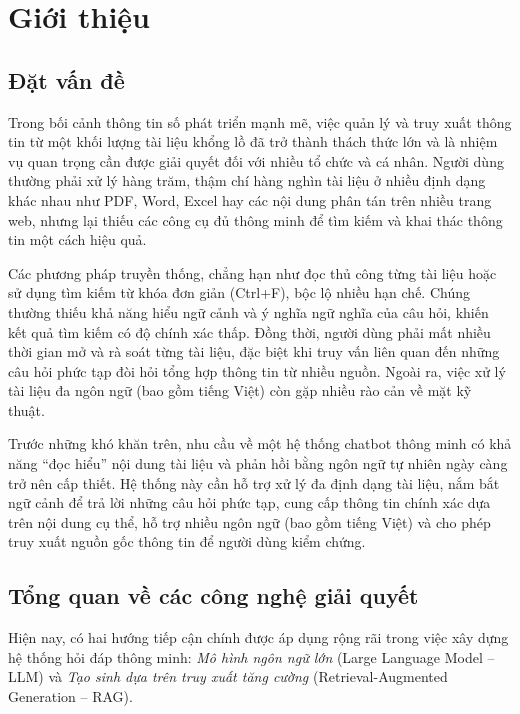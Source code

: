 \renewcommand{\chaptername}{Phần}
\renewcommand{\figurename}{Hình}

\chapter{Giới thiệu}

\section{Đặt vấn đề}

Trong bối cảnh thông tin số phát triển mạnh mẽ, việc quản lý và truy xuất thông tin từ một khối lượng tài liệu khổng lồ đã trở thành thách thức lớn và là nhiệm vụ quan trọng cần được giải quyết đối với nhiều tổ chức và cá nhân. Người dùng thường phải xử lý hàng trăm, thậm chí hàng nghìn tài liệu ở nhiều định dạng khác nhau như PDF, Word, Excel hay các nội dung phân tán trên nhiều trang web, nhưng lại thiếu các công cụ đủ thông minh để tìm kiếm và khai thác thông tin một cách hiệu quả. 

Các phương pháp truyền thống, chẳng hạn như đọc thủ công từng tài liệu hoặc sử dụng tìm kiếm từ khóa đơn giản (Ctrl+F), bộc lộ nhiều hạn chế. Chúng thường thiếu khả năng hiểu ngữ cảnh và ý nghĩa ngữ nghĩa của câu hỏi, khiến kết quả tìm kiếm có độ chính xác thấp. Đồng thời, người dùng phải mất nhiều thời gian mở và rà soát từng tài liệu, đặc biệt khi truy vấn liên quan đến những câu hỏi phức tạp đòi hỏi tổng hợp thông tin từ nhiều nguồn. Ngoài ra, việc xử lý tài liệu đa ngôn ngữ (bao gồm tiếng Việt) còn gặp nhiều rào cản về mặt kỹ thuật.

Trước những khó khăn trên, nhu cầu về một hệ thống chatbot thông minh có khả năng “đọc hiểu” nội dung tài liệu và phản hồi bằng ngôn ngữ tự nhiên ngày càng trở nên cấp thiết. Hệ thống này cần hỗ trợ xử lý đa định dạng tài liệu, nắm bắt ngữ cảnh để trả lời những câu hỏi phức tạp, cung cấp thông tin chính xác dựa trên nội dung cụ thể, hỗ trợ nhiều ngôn ngữ (bao gồm tiếng Việt) và cho phép truy xuất nguồn gốc thông tin để người dùng kiểm chứng.

\section{Tổng quan về các công nghệ giải quyết}

Hiện nay, có hai hướng tiếp cận chính được áp dụng rộng rãi trong việc xây dựng hệ thống hỏi đáp thông minh: \emph{Mô hình ngôn ngữ lớn} (Large Language Model -- LLM) và \emph{Tạo sinh dựa trên truy xuất tăng cường} (Retrieval-Augmented Generation -- RAG).

